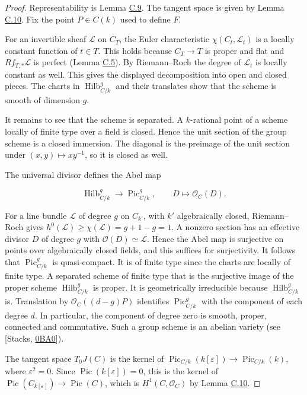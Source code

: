 \documentclass[11pt]{article}
\begin{document}
\begin{proof}[{Proof}]\label{bp155}%
Representability is Lemma \hyperref[bp149]{C.9}. The tangent space is given by Lemma \hyperref[bp152]{C.10}. Fix the point \(P\in C(k)\) used to define \(F\).

For an invertible sheaf \(\mathcal L\) on \(C_T\), the Euler characteristic \(\chi(C_t,\mathcal L_t)\) is a locally constant function of \(t\in T\). This holds because \(C_T\to T\) is proper and flat and \(Rf_{T,*}\mathcal L\) is perfect (Lemma \hyperref[bp135]{C.5}). By Riemann–Roch the degree of \(\mathcal L_t\) is locally constant as well. This gives the displayed decomposition into open and closed pieces. The charts in \(\operatorname{Hilb}^{g}_{C/k}\) and their translates show that the scheme is smooth of dimension \(g\).

It remains to see that the scheme is separated. A \(k\)-rational point of a scheme locally of finite type over a field is closed. Hence the unit section of the group scheme is a closed immersion. The diagonal is the preimage of the unit section under \((x,y)\mapsto xy^{-1}\), so it is closed as well.

The universal divisor defines the Abel map

\[
\operatorname{Hilb}^{g}_{C/k}\longrightarrow\operatorname{Pic}^g_{C/k},
\qquad D\longmapsto\mathcal O_C(D).
\]

For a line bundle \(\mathcal L\) of degree \(g\) on \(C_{k'}\), with \(k'\) algebraically closed, Riemann–Roch gives \(h^0(\mathcal L)\geq\chi(\mathcal L)=g+1-g=1\). A nonzero section has an effective divisor \(D\) of degree \(g\) with \(\mathcal O(D)\simeq\mathcal L\). Hence the Abel map is surjective on points over algebraically closed fields, and this suffices for surjectivity. It follows that \(\operatorname{Pic}^g_{C/k}\) is quasi-compact. It is of finite type since the charts are locally of finite type. A separated scheme of finite type that is the surjective image of the proper scheme \(\operatorname{Hilb}^{g}_{C/k}\) is proper. It is geometrically irreducible because \(\operatorname{Hilb}^{g}_{C/k}\) is. Translation by \(\mathcal O_C((d-g)P)\) identifies \(\operatorname{Pic}^g_{C/k}\) with the component of each degree \(d\). In particular, the component of degree zero is smooth, proper, connected and commutative. Such a group scheme is an abelian variety (see [Stacks, \href{https://stacks.math.columbia.edu/tag/0BA0}{0BA0}]).

The tangent space \(T_0J(C)\) is the kernel of \(\operatorname{Pic}_{C/k}(k[\varepsilon])\to\operatorname{Pic}_{C/k}(k)\), where \(\varepsilon^2=0\). Since \(\operatorname{Pic}(k[\varepsilon])=0\), this is the kernel of \(\operatorname{Pic}(C_{k[\varepsilon]})\to\operatorname{Pic}(C)\), which is \(H^1(C,\mathcal O_C)\) by Lemma \hyperref[bp152]{C.10}.


\end{proof}
\end{document}
